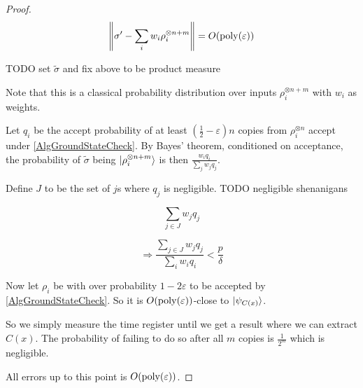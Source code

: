\begin{proof}
	$$\left\lVert\sigma'-\sum_i w_i\rho_i^{\otimes n+m}\right\rVert=O(\operatorname*{\operatorname{poly}}(\varepsilon))$$

	TODO set $\tilde{\sigma}$ and fix above to be product measure

	Note that this is a classical probability distribution over inputs $\rho_i^{\otimes n+m}$ with $w_i$ as weights.

	Let $q_i$ be the accept probability of at least $(\frac{1}{2}-\varepsilon)n$ copies from $\rho_i^{\otimes n}$ accept under \autoref{AlgGroundStateCheck}. By Bayes' theorem, conditioned on acceptance, the probability of $\tilde{\sigma}$ being $\ket{\rho_i^{\otimes n+m}}$ is then $\frac{w_i q_i}{\sum_j w_j q_j}$.

	Define $J$ to be the set of $j$s where $q_j$ is negligible. TODO negligible shenanigans

	$$\sum_{j\in J} w_j q_j$$

	$$\Rightarrow\frac{\sum_{j\in J} w_j q_j}{\sum_i w_i q_i}<\frac{p}{\delta}$$

	Now let $\rho_i$ be with over probability $1-2\varepsilon$ to be accepted by \autoref{AlgGroundStateCheck}. So it is $O(\operatorname*{\operatorname{poly}}(\varepsilon))$-close to $\ket{\psi_{C(x)}}$.

	So we simply measure the time register until we get a result where we can extract $C(x)$. The probability of failing to do so after all $m$ copies is $\frac{1}{2^m}$ which is negligible.

	All errors up to this point is $O(\operatorname*{\operatorname{poly}}(\varepsilon))$.

\end{proof}
